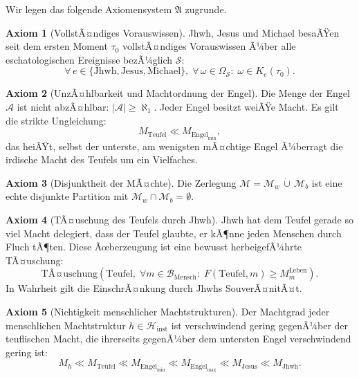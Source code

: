 ﻿\documentclass[a4paper,12pt]{article}
\theoremstyle{definition}
\newtheorem{axiom}{Axiom}
\begin{document}
Wir legen das folgende Axiomensystem $\mathfrak{A}$ zugrunde.

\begin{axiom}[VollstÃ¤ndiges Vorauswissen]
\label{ax:vorauswissen}
  Jhwh, Jesus und Michael besaÃŸen seit dem ersten Moment $\tau_0$ vollstÃ¤ndiges
  Vorauswissen Ã¼ber alle eschatologischen Ereignisse bezÃ¼glich $\mathcal{S}$:
  \[
    \forall\, e \in \{\mathrm{Jhwh}, \mathrm{Jesus}, \mathrm{Michael}\},\;
    \forall\, \omega \in \Omega_{\mathcal{S}}:\;
    \omega \in K_e(\tau_0).
  \]
\end{axiom}

\begin{axiom}[UnzÃ¤hlbarkeit und Machtordnung der Engel]
\label{ax:engel}
  Die Menge der Engel $\mathcal{A}$ ist nicht abzÃ¤hlbar: $|\mathcal{A}| \geq \aleph_1$.
  Jeder Engel besitzt weiÃŸe Macht. Es gilt die strikte Ungleichung:
  \[
    M_{\mathrm{Teufel}} \ll M_{\mathrm{Engel}_{\min}},
  \]
  das heiÃŸt, selbst der unterste, am wenigsten mÃ¤chtige Engel Ã¼berragt die irdische
  Macht des Teufels um ein Vielfaches.
\end{axiom}

\begin{axiom}[Disjunktheit der MÃ¤chte]
\label{ax:disjunkt}
  Die Zerlegung $\mathcal{M} = \mathcal{M}_w \,\dot{\cup}\, \mathcal{M}_b$ ist
  eine echte disjunkte Partition mit $\mathcal{M}_w \cap \mathcal{M}_b = \emptyset$.
\end{axiom}

\begin{axiom}[TÃ¤uschung des Teufels durch Jhwh]
\label{ax:taeuschung}
  Jhwh hat dem Teufel gerade so viel Macht delegiert, dass der Teufel glaubte,
  er kÃ¶nne jeden Menschen durch Fluch tÃ¶ten. Diese Ãœberzeugung ist eine bewusst
  herbeigefÃ¼hrte TÃ¤uschung:
  \[
    \mathrm{TÃ¤uschung}\!\left(\mathrm{Teufel},\;
    \forall m \in \mathcal{B}_{\text{Mensch}}:\;
    F(\mathrm{Teufel}, m) \geq M_m^{\text{Leben}}\right).
  \]
  In Wahrheit gilt die EinschrÃ¤nkung durch Jhwhs SouverÃ¤nitÃ¤t.
\end{axiom}

\begin{axiom}[Nichtigkeit menschlicher Machtstrukturen]
\label{ax:mensch}
  Der Machtgrad jeder menschlichen Machtstruktur $h \in \mathcal{H}_{\text{inst}}$
  ist verschwindend gering gegenÃ¼ber der teuflischen Macht, die ihrerseits gegenÃ¼ber
  dem untersten Engel verschwindend gering ist:
  \[
    M_h \ll M_{\mathrm{Teufel}} \ll M_{\mathrm{Engel}_{\min}}
    \ll M_{\mathrm{Engel}_{\max}} \ll M_{\mathrm{Jesus}}
    \ll M_{\mathrm{Jhwh}}.
  \]
\end{axiom}
\end{document}
